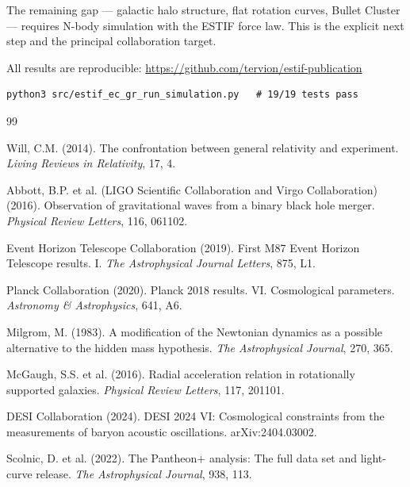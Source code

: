 \documentclass[12pt]{article}
\begin{document}
The remaining gap --- galactic halo structure, flat rotation curves, Bullet Cluster ---
requires N-body simulation with the ESTIF force law. This is the explicit next step
and the principal collaboration target.

All results are reproducible: \url{https://github.com/tervion/estif-publication}

\begin{verbatim}
python3 src/estif_ec_gr_run_simulation.py   # 19/19 tests pass
\end{verbatim}

\begin{thebibliography}{99}

Will, C.M. (2014). The confrontation between general relativity and experiment.
\textit{Living Reviews in Relativity}, 17, 4.

Abbott, B.P. et al. (LIGO Scientific Collaboration and Virgo Collaboration) (2016).
Observation of gravitational waves from a binary black hole merger.
\textit{Physical Review Letters}, 116, 061102.

Event Horizon Telescope Collaboration (2019).
First M87 Event Horizon Telescope results. I.
\textit{The Astrophysical Journal Letters}, 875, L1.

Planck Collaboration (2020).
Planck 2018 results. VI. Cosmological parameters.
\textit{Astronomy \& Astrophysics}, 641, A6.

Milgrom, M. (1983).
A modification of the Newtonian dynamics as a possible alternative to the hidden mass hypothesis.
\textit{The Astrophysical Journal}, 270, 365.

McGaugh, S.S. et al. (2016).
Radial acceleration relation in rotationally supported galaxies.
\textit{Physical Review Letters}, 117, 201101.

DESI Collaboration (2024).
DESI 2024 VI: Cosmological constraints from the measurements of baryon acoustic oscillations.
arXiv:2404.03002.

Scolnic, D. et al. (2022).
The Pantheon+ analysis: The full data set and light-curve release.
\textit{The Astrophysical Journal}, 938, 113.

\end{thebibliography}
\end{document}
